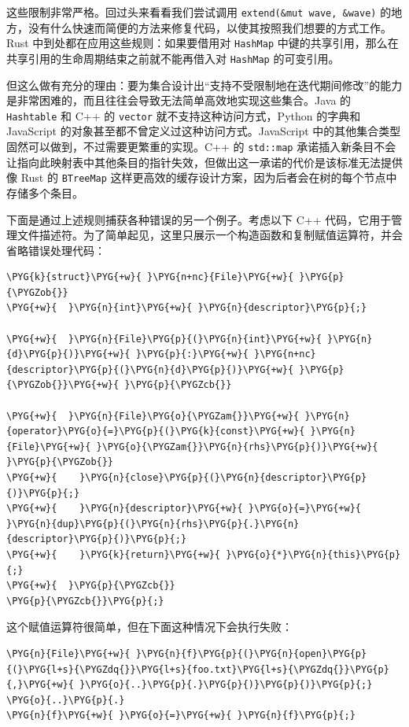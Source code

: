 这些限制非常严格。回过头来看看我们尝试调用 \texttt{extend(\&mut wave, \&wave)} 的地方，没有什么快速而简便的方法来修复代码，以使其按照我们想要的方式工作。Rust 中到处都在应用这些规则：如果要借用对 \texttt{HashMap} 中键的共享引用，那么在共享引用的生命周期结束之前就不能再借入对 \texttt{HashMap} 的可变引用。

但这么做有充分的理由：要为集合设计出“支持不受限制地在迭代期间修改”的能力是非常困难的，而且往往会导致无法简单高效地实现这些集合。Java 的 \texttt{Hashtable} 和 C++ 的 \texttt{vector} 就不支持这种访问方式，Python 的字典和 JavaScript 的对象甚至都不曾定义过这种访问方式。JavaScript 中的其他集合类型固然可以做到，不过需要更繁重的实现。C++ 的 \texttt{std::map} 承诺插入新条目不会让指向此映射表中其他条目的指针失效，但做出这一承诺的代价是该标准无法提供像 Rust 的 \texttt{BTreeMap} 这样更高效的缓存设计方案，因为后者会在树的每个节点中存储多个条目。

下面是通过上述规则捕获各种错误的另一个例子。考虑以下 C++ 代码，它用于管理文件描述符。为了简单起见，这里只展示一个构造函数和复制赋值运算符，并会省略错误处理代码：

\begin{Verbatim}[commandchars=\\\{\},breaklines=true,breakanywhere=true,fontsize=\codefont,xleftmargin=17bp]
\PYG{k}{struct}\PYG{+w}{ }\PYG{n+nc}{File}\PYG{+w}{ }\PYG{p}{\PYGZob{}}
\PYG{+w}{  }\PYG{n}{int}\PYG{+w}{ }\PYG{n}{descriptor}\PYG{p}{;}

\PYG{+w}{  }\PYG{n}{File}\PYG{p}{(}\PYG{n}{int}\PYG{+w}{ }\PYG{n}{d}\PYG{p}{)}\PYG{+w}{ }\PYG{p}{:}\PYG{+w}{ }\PYG{n+nc}{descriptor}\PYG{p}{(}\PYG{n}{d}\PYG{p}{)}\PYG{+w}{ }\PYG{p}{\PYGZob{}}\PYG{+w}{ }\PYG{p}{\PYGZcb{}}

\PYG{+w}{  }\PYG{n}{File}\PYG{o}{\PYGZam{}}\PYG{+w}{ }\PYG{n}{operator}\PYG{o}{=}\PYG{p}{(}\PYG{k}{const}\PYG{+w}{ }\PYG{n}{File}\PYG{+w}{ }\PYG{o}{\PYGZam{}}\PYG{n}{rhs}\PYG{p}{)}\PYG{+w}{ }\PYG{p}{\PYGZob{}}
\PYG{+w}{    }\PYG{n}{close}\PYG{p}{(}\PYG{n}{descriptor}\PYG{p}{)}\PYG{p}{;}
\PYG{+w}{    }\PYG{n}{descriptor}\PYG{+w}{ }\PYG{o}{=}\PYG{+w}{ }\PYG{n}{dup}\PYG{p}{(}\PYG{n}{rhs}\PYG{p}{.}\PYG{n}{descriptor}\PYG{p}{)}\PYG{p}{;}
\PYG{+w}{    }\PYG{k}{return}\PYG{+w}{ }\PYG{o}{*}\PYG{n}{this}\PYG{p}{;}
\PYG{+w}{  }\PYG{p}{\PYGZcb{}}
\PYG{p}{\PYGZcb{}}\PYG{p}{;}
\end{Verbatim}

这个赋值运算符很简单，但在下面这种情况下会执行失败：

\begin{Verbatim}[commandchars=\\\{\},breaklines=true,breakanywhere=true,fontsize=\codefont,xleftmargin=17bp]
\PYG{n}{File}\PYG{+w}{ }\PYG{n}{f}\PYG{p}{(}\PYG{n}{open}\PYG{p}{(}\PYG{l+s}{\PYGZdq{}}\PYG{l+s}{foo.txt}\PYG{l+s}{\PYGZdq{}}\PYG{p}{,}\PYG{+w}{ }\PYG{o}{..}\PYG{p}{.}\PYG{p}{)}\PYG{p}{)}\PYG{p}{;}
\PYG{o}{..}\PYG{p}{.}
\PYG{n}{f}\PYG{+w}{ }\PYG{o}{=}\PYG{+w}{ }\PYG{n}{f}\PYG{p}{;}
\end{Verbatim}


